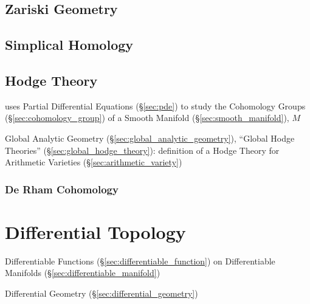 \subsection{Zariski Geometry}\label{sec:zariski_geometry}

\subsection{Simplical Homology}\label{sec:simplical_homology}

\subsection{Hodge Theory}\label{sec:hodge_theory}

uses Partial Differential Equations (\S\ref{sec:pde}) to study the Cohomology
Groups (\S\ref{sec:cohomology_group}) of a Smooth Manifold
(\S\ref{sec:smooth_manifold}), $M$

\fist Global Analytic Geometry (\S\ref{sec:global_analytic_geometry}), ``Global
Hodge Theories'' (\S\ref{sec:global_hodge_theory}): definition of a Hodge
Theory for Arithmetic Varieties (\S\ref{sec:arithmetic_variety})



\subsubsection{De Rham Cohomology}\label{sec:derham_cohomology}



\section{Differential Topology}\label{sec:differential_topology}

Differentiable Functions (\S\ref{sec:differentiable_function}) on Differentiable
Manifolds (\S\ref{sec:differentiable_manifold})

\fist Differential Geometry (\S\ref{sec:differential_geometry})

